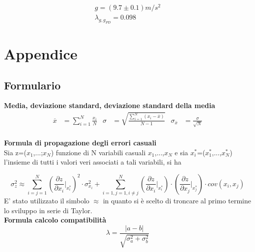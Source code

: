 \documentclass[a4paper,11pt,oneside]{article}
\begin{document}
\begin{gather*}
  g=(9.7\pm0.1) \si{m/s^{2}}\\
\lambda_{g, g_{PD}}=0.098  
\end{gather*}

\newpage
\section{Appendice}
\subsection{Formulario}
\textbf{Media, deviazione standard, deviazione standard della media}
\begin{align*}
        \overline{x}&=\sum\limits_{i=1}^{N} \frac{x_{i}}{N}&
        \sigma&=\sqrt{\frac{\sum\limits_{i=1}^{N} (x_{i}-\overline{x})}{N-1}}&
        \sigma_{\overline{x}}&=\frac{\sigma}{\sqrt{N}}
\end{align*}\\

\textbf{Formula di propagazione degli errori casuali}\\

Sia z=($x_1$,...;$x_N$) funzione di N variabili casuali $x_1$,...,$x_N$ e sia ${x_i^\ast}$=($x_1^\ast$,...,$x_N^{\ast}$) l'insieme di tutti i valori veri associati a tali variabili, si ha 

\begin{equation*}
    \sigma_z^{2}\approx  \sum_{i=j=1}^{N}\left ( \frac{\partial z}{\partial x_i}\Big|_{x_i^{\ast}} \right )^{2}\cdot\sigma_{x_i}^{2} +\sum_{i=1,j=1,i\neq j}^{N}\left (\frac{\partial z }{\partial x_i}\Big|_{x_i^{\ast}} \right ) \cdot \left ( \frac{\partial z}{\partial x_j} \Big|_{x_j^{\ast}} \right )\cdot cov(x_i,x_j)\label{eq:prop_errori}
\end{equation*}
E' stato utilizzato il simbolo $\approx$ in quanto si è scelto di troncare al primo termine lo sviluppo in serie di Taylor.\\


\textbf{Formula calcolo compatibilità}\\
\begin{equation*}
    \lambda=\frac{\left|a-b\right|}{\sqrt{\sigma^{2}_{a}+\sigma^{2}_{b}}}
\end{equation*}\\
\end{document}
